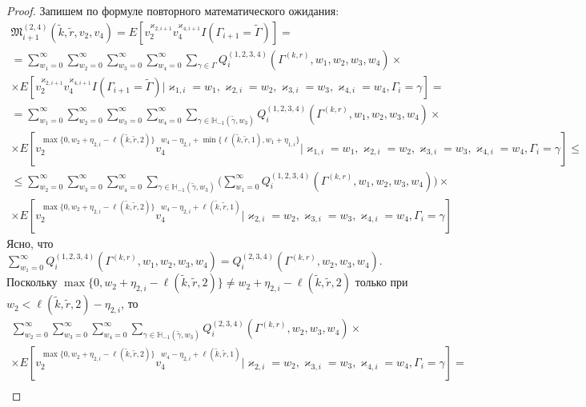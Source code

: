 \documentclass[a4paper,12pt,russian]{extarticle}
\begin{document}
\begin{proof}
Запишем по формуле повторного математического ожидания:
\begin{multline}
\mathfrak{M}^{(2,4)}_{i+1}(\tilde{k},\tilde{r}, v_2, v_4) = E[ v_2^{\varkappa_{2,i+1}} v_4^{\varkappa_{4,i+1}}I(\Gamma_{i+1}=\tilde{\Gamma})] = \\ =
\sum_{w_1=0}^{\infty} \sum_{w_2=0}^{\infty}  \sum_{w_3=0}^{\infty} 
\sum_{w_4=0}^{\infty} \sum_{\gamma \in \Gamma}  Q^{(1,2,3,4)}_i(\Gamma^{(k,r)},w_1, w_2, w_3,w_4) \times \\ \times 
E[v_2^{\varkappa_{2,i+1}} v_4^{\varkappa_{4,i+1}}I(\Gamma_{i+1}=\tilde{\Gamma}) | \varkappa_{1,i}=w_1, \varkappa_{2,i}=w_2,\varkappa_{3,i}=w_3, \varkappa_{4,i}=w_4, \Gamma_i=\gamma] = \\ =
\sum_{w_1=0}^{\infty} \sum_{w_2=0}^{\infty} \sum_{w_3=0}^{\infty} \sum_{w_4=0}^{\infty} \sum_{\gamma \in {\mathbb H}_{-1}(\tilde{\gamma},w_3)}  Q^{(1,2,3,4)}_i(\Gamma^{(k,r)},w_1, w_2, w_3,w_4)
\times \\ \times E[v_2^{\max{\{0, w_{2} + \eta_{2,i} - \ell(\tilde{k},\tilde{r},2)\}}} v_4^{w_4 - \eta_{2,i} + \min{\{\ell(\tilde{k},\tilde{r},1), w_1 + \eta_{1,i} \}}} | \varkappa_{1,i}=w_1,  \varkappa_{2,i}=w_2, \varkappa_{3,i}=w_3, \varkappa_{4,i}=w_4, \Gamma_i=\gamma] \leqslant \\ 
\leqslant
\sum_{w_2=0}^{\infty}  \sum_{w_3=0}^{\infty} \sum_{w_4=0}^{\infty}  \sum_{\gamma \in {\mathbb H}_{-1}(\tilde{\gamma},w_3)}  \bigl( \sum_{w_1=0}^{\infty} Q^{(1,2,3,4)}_i(\Gamma^{(k,r)},w_1, w_2, w_3,w_4) \bigr)
\times \\ \times E[ v_2^{\max{\{0, w_{2} + \eta_{2,i} - \ell(\tilde{k},\tilde{r},2)\}} }  v_4^{w_4 - \eta_{2,i} + \ell(\tilde{k},\tilde{r},1)} | \varkappa_{2,i}=w_2, \varkappa_{3,i}=w_3, \varkappa_{4,i}=w_4, \Gamma_i=\gamma]
\label{third:fourth:try:gen}
\end{multline}
Ясно, что  $\sum_{w_1=0}^{\infty}Q^{(1,2,3,4)}_i(\Gamma^{(k,r)},w_1, w_2, w_3,w_4) = Q^{(2,3,4)}_i(\Gamma^{(k,r)}, w_2, w_3,w_4) $. Поскольку $\max{\{0, w_{2} + \eta_{2,i} - \ell(\tilde{k},\tilde{r},2)\}}\neq w_{2} + \eta_{2,i} - \ell(\tilde{k},\tilde{r},2)$ только при $w_2 <  \ell(\tilde{k},\tilde{r},2) - \eta_{2,i} $, то 
\begin{multline}
\sum_{w_2=0}^{\infty} \sum_{w_3=0}^{\infty} \sum_{w_4=0}^{\infty}  \sum_{\gamma \in {\mathbb H}_{-1}(\tilde{\gamma},w_3)}   Q^{(2,3,4)}_i(\Gamma^{(k,r)}, w_2, w_3,w_4)
\times \\ \times E[ v_2^{\max{\{0, w_{2} + \eta_{2,i} - \ell(\tilde{k},\tilde{r},2)\}} }  v_4^{w_4 - \eta_{2,i} + \ell(\tilde{k},\tilde{r},1)} |  \varkappa_{2,i}=w_2, \varkappa_{3,i}=w_3, \varkappa_{4,i}=w_4, \Gamma_i=\gamma] = \\

\end{multline}
\end{proof}
\end{document}
